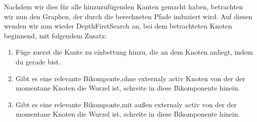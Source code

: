 \documentclass[runningheads]{llncs}
\begin{document}
    Nachdem wir dies für alle hinzuzufügenden Kanten gemacht haben, betrachten wir nun den Graphen, der durch die berechneten Pfade induziert wird. Auf diesen wenden wir nun wieder DepthFirstSearch an, bei dem betrachteten Knoten beginnend, mit folgendem Zusatz:
    \begin{enumerate}
        \item Füge zuerst die Kante zu einbettung hinzu, die an dem Knoten anliegt, indem du gerade bist.
        \item Gibt es eine relevante Bikomponte,ohne externaly activ Knoten von der der momentane Knoten die Wurzel ist, schreite in diese Bikomponente hinein.
        \item Gibt es eine relevante Bikomponte,mit außen externaly activ von der der momentane Knoten die Wurzel ist, schreite in diese Bikomponente hinein.

    \end{enumerate}
\end{document}
